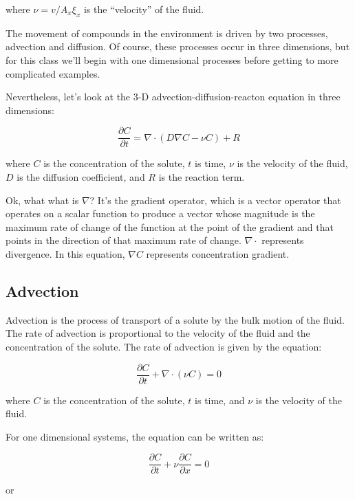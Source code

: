 \documentclass{tufte-handout}\usepackage[]{graphicx}\usepackage[]{xcolor}
\begin{document}
where $\nu = v/A_x \xi_x$ is the ``velocity'' of the fluid.

The movement of compounds in the environment is driven by two processes, advection and diffusion. Of course, these processes occur in three dimensions, but for this class we'll begin with one dimensional processes before getting to more complicated examples.

Nevertheless, let's look at the 3-D advection-diffusion-reacton equation in three dimensions:

\begin{equation}
\frac{\partial C}{\partial t} = \nabla \cdot (D\nabla C - \nu C) + R
\end{equation}

where $C$ is the concentration of the solute, $t$ is time, $\nu$ is the velocity of the fluid, $D$ is the diffusion coefficient, and $R$ is the reaction term.

Ok, what what is $\nabla$? It's the gradient operator, which is a vector operator that operates on a scalar function to produce a vector whose magnitude is the maximum rate of change of the function at the point of the gradient and that points in the direction of that maximum rate of change. $\nabla \cdot$ represents divergence. In this equation, $\nabla C$ represents concentration gradient.

\subsection{Advection}

Advection is the process of transport of a solute by the bulk motion of the fluid. The rate of advection is proportional to the velocity of the fluid and the concentration of the solute. The rate of advection is given by the equation:

\begin{equation}
\frac{\partial C}{\partial t} + \nabla \cdot (\nu C) = 0
\end{equation}

where $C$ is the concentration of the solute, $t$ is time, and $\nu$ is the velocity of the fluid. 

For one dimensional systems, the equation can be written as:

\begin{equation}
\frac{\partial C}{\partial t} + \nu \frac{\partial C}{\partial x} = 0
\end{equation}

or
\end{document}
